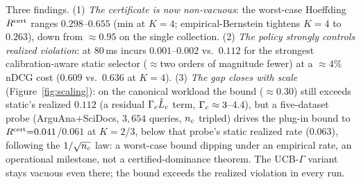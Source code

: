 \begin{table}[t]
\centering
\caption{Certified compiler on the combined SciFact+FiQA+NFCorpus workload ($1{,}271$ queries, real external operators, mean over 5 seeds, budget $80$\,ms). $\Rcert$ is the certified bound; violation is the realized eval-window SLO-violation rate. The plug-in bound exceeds the realized violation in every run of both the $25$ budget-$80$ K-sweep runs (shown) and the $15$ main-$K{=}4$ runs across the three budgets.}
\label{tab:cert-scale}
\end{table}

Three findings. (1) \emph{The certificate is now non-vacuous}: the worst-case Hoeffding $\Rcert$ ranges $0.298$--$0.655$ (min at $K{=}4$; empirical-Bernstein tightens $K{=}4$ to $0.263$), down from $\approx0.95$ on the single collection. (2) \emph{The policy strongly controls realized violation}: at $80$\,ms \CWC{} incurs $0.001$--$0.002$ vs.\ $0.112$ for the strongest calibration-aware static selector ($\approx$two orders of magnitude fewer) at a $\approx4\%$ nDCG cost ($0.609$ vs.\ $0.636$ at $K{=}4$). (3) \emph{The gap closes with scale} (Figure~\ref{fig:scaling}): on the canonical workload the bound ($\approx0.30$) still exceeds static's realized $0.112$ (a residual $\Gamma_c\hat L_c$ term, $\Gamma_c\approx3$--$4.4$), but a five-dataset probe (ArguAna+SciDocs, $3{,}654$ queries, $n_c$ tripled) drives the plug-in bound to $R^{\mathrm{cert}}{=}0.041$/$0.061$ at $K{=}2$/$3$, below that probe's static realized rate ($0.063$), following the $1/\sqrt{n_c}$ law: a worst-case bound dipping under an empirical rate, an operational milestone, not a certified-dominance theorem. The UCB-$\Gamma$ variant stays vacuous even there; the bound exceeds the realized violation in every run.

